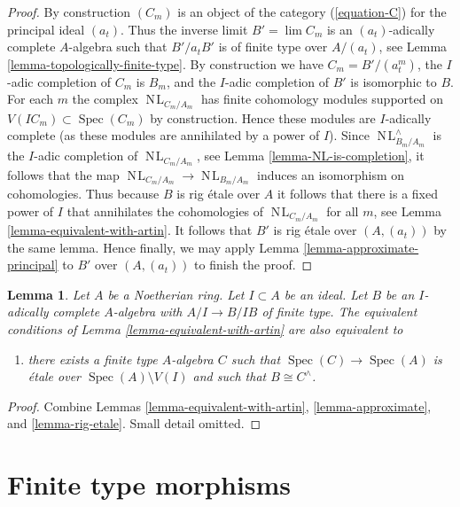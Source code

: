 \documentclass{stacks-project}
\theoremstyle{plain}
\newtheorem{lemma}[subsection]{Lemma}
\theoremstyle{definition}
\theoremstyle{remark}
\numberwithin{equation}{subsection}
\def\lim{\mathop{\mathrm{lim}}\nolimits}
\def\Spec{\mathop{\mathrm{Spec}}}
\def\NL{\mathop{N\!L}\nolimits}
\begin{document}
\begin{proof}
\medskip\noindent
By construction $(C_m)$ is an object of the category
(\ref{equation-C}) for the principal ideal $(a_t)$.
Thus the inverse limit $B' = \lim C_m$ is an $(a_t)$-adically
complete $A$-algebra such that $B'/a_t B'$ is of finite type
over $A/(a_t)$, see Lemma \ref{lemma-topologically-finite-type}.
By construction we have $C_m = B'/(a_t^m)$, the $I$-adic
completion of $C_m$ is $B_m$, and the $I$-adic completion of
$B'$ is isomorphic to $B$.
For each $m$ the complex $\NL_{C_m/A_m}$ has finite cohomology
modules supported on $V(IC_m) \subset \Spec(C_m)$ by construction.
Hence these modules are $I$-adically complete (as these modules
are annihilated by a power of $I$). Since $\NL^\wedge_{B_m/A_m}$
is the $I$-adic completion of $\NL_{C_m/A_m}$, see
Lemma \ref{lemma-NL-is-completion}, it
follows that the map $\NL_{C_m/A_m} \to \NL_{B_m/A_m}$ induces
an isomorphism on cohomologies. Thus because $B$ is rig \'etale
over $A$ it follows that there is a fixed power of $I$ that annihilates
the cohomologies of $\NL_{C_m/A_m}$ for all $m$, see
Lemma \ref{lemma-equivalent-with-artin}. It follows that $B'$
is rig \'etale over $(A, (a_t))$ by the same lemma.
Hence finally, we may apply Lemma \ref{lemma-approximate-principal}
to $B'$ over $(A, (a_t))$ to finish the proof.
\end{proof}

\begin{lemma}
\label{lemma-approximate-by-etale-over-complement}
Let $A$ be a Noetherian ring. Let $I \subset A$ be an ideal.
Let $B$ be an $I$-adically complete $A$-algebra with $A/I \to B/IB$
of finite type. The equivalent conditions of
Lemma \ref{lemma-equivalent-with-artin} are also equivalent to
\begin{enumerate}
\item[(8)]
\label{item-algebraize}
there exists a finite type $A$-algebra $C$ such that
$\Spec(C) \to \Spec(A)$ is \'etale over $\Spec(A) \setminus V(I)$
and such that $B \cong C^\wedge$.
\end{enumerate}
\end{lemma}

\begin{proof}
Combine Lemmas \ref{lemma-equivalent-with-artin}, \ref{lemma-approximate}, and
\ref{lemma-rig-etale}. Small detail omitted.
\end{proof}




\section{Finite type morphisms}
\label{section-finite-type}
\end{document}
